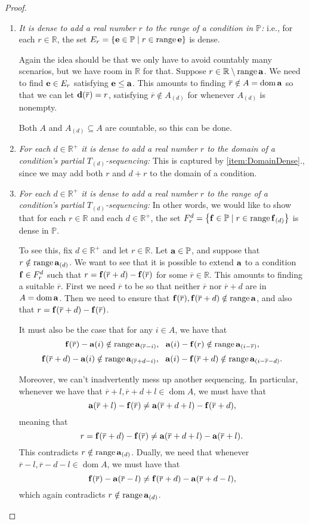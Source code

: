 \documentclass[11pt]{amsart}
\theoremstyle{definition}
\theoremstyle{remark}
\renewcommand{\P}{\mathbb{P}}
\newcommand{\R}{\mathbb{R}}
\DeclareMathOperator{\ran}{range}
\DeclareMathOperator{\dom}{dom}
\newcommand{\st}{\; | \;}
\newcommand{\set}[2]{\left\{#1\st #2 \right\}}
\renewcommand{\a}{\textup{\textbf{a}}}
\renewcommand{\d}{\textup{\textbf{d}}}
\newcommand{\e}{\textup{\textbf{e}}}
\newcommand{\f}{\textup{\textbf{f}}}
\renewcommand{\r}{\overline r}
\begin{document}
\begin{proof}
\begin{enumerate}
	\item \emph{It is dense to add a real number $r$ to the range of a condition in $\P$:} i.e., for each $r \in \R$, the set $E_r=\set{\e \in \P}{r \in \ran \e }$ is dense. 
	
	Again the idea should be that we only have to avoid countably many scenarios, but we have room in $\R$ for that. Suppose $r \in \R \setminus \ran \a$. We need to find $\e \in E_r$ satisfying $\e \leq \a$. This amounts to finding $\r \notin A = \dom \a$ so that we can let $\d(\overline r)=r$, satisfying $\r \notin A_{(d)}$ for whenever $A_{(d)}$ is nonempty.
	
	Both $A$ and $A_{(d)} \subseteq A$ are countable, so this can be done. \\
		
	\item \label{item:StepFunctionDomainDense} \emph{For each $d \in \R^+$ it is dense to add a real number $r$ to the domain of a condition's partial $T_{(d)}$-sequencing:} This is captured by \ref{item:DomainDense}., since we may add both $r$ and $d+r$ to the domain of a condition.\\
	\item \emph{For each $d \in \R^+$ it is dense to add a real number $r$ to the range of a condition's partial $T_{(d)}$-sequencing:} In other words, we would like to show that for each $r \in \R$ and each $d \in \R^+$, the set $F^d_r=\set{\f \in \P}{r \in \ran \f_{(d)}}$ is dense in $\P$. 
	
	To see this, fix $d \in \R^+$ and let $r \in \R$. Let $\a \in \P$, and suppose that $r \notin \ran\a_{(d)}$. We want to see that it is possible to extend $\a$ to a condition $\f \in F^d_r$ such that $r=\f(\r+d)-\f(\r)$ for some $\r \in \R$. This amounts to finding a suitable $\r$. First we need $\r$ to be so that neither $\r$ nor $\r+d$ are in $A = \dom \a$. Then we need to ensure that $\f(\r), \f(\r+d) \notin \ran \a$, and also that $r=\f(\r+d)-\f(\r)$. 

	It must also be the case that for any $i\in A$, we have that 
		$$\f(\r)-\a(i) \notin \ran \a_{(\r-i)}, \ \  \a(i)-\f(r) \notin \ran \a_{(i-\r)},$$ 
		$$\f(\r+d) - \a(i) \notin \ran \a_{(\r+d-i)}, \ \ \a(i) - \f(\r+d) \notin \ran \a_{(i-\r-d)}.$$

Moreover, we can't inadvertently mess up another sequencing. In particular, whenever we have that $\r+l, \r+d+l \in \dom A$, we must have that $$\a(\r+l)-\f(\r)\neq \a(\r+d+l) - \f(\r+d),$$ meaning that $$r= \f(\r+d)-\f(\r) \neq \a(\r+d+l) - \a(\r+l).$$ This contradicts $r \notin \ran \a_{(d)}$. Dually, we need that whenever $\r-l, \r-d-l \in \dom A$, we must have that $$\f(\r)-\a(\r-l) \neq \f(\r+d)-\a(\r+d-l),$$ which again contradicts $r \notin \ran \a_{(d)}$.


\end{enumerate}
\end{proof}
\end{document}

